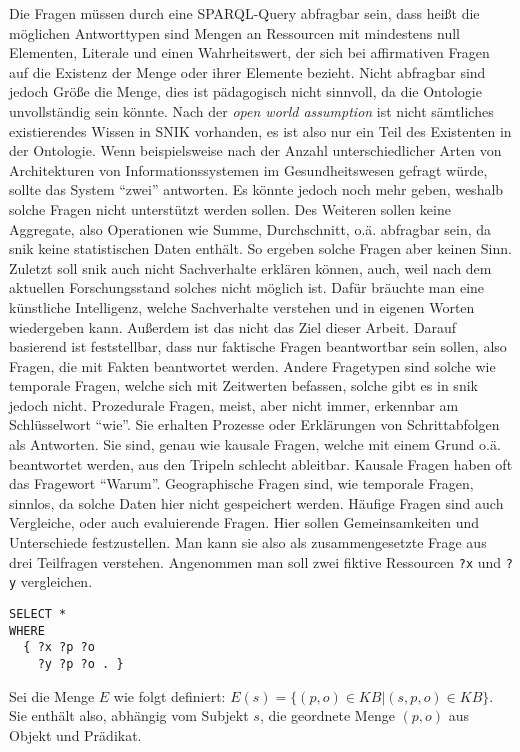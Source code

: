 Die Fragen müssen durch eine SPARQL-Query abfragbar sein, dass heißt die möglichen Antworttypen sind Mengen an Ressourcen mit mindestens null Elementen, Literale und einen Wahrheitswert,
der sich bei affirmativen Fragen auf die Existenz der Menge oder ihrer Elemente bezieht.
Nicht abfragbar sind jedoch Größe die Menge, dies ist pädagogisch nicht sinnvoll, da die Ontologie unvollständig sein könnte.
Nach der \emph{open world assumption} ist nicht sämtliches existierendes Wissen in SNIK vorhanden, es ist also nur ein Teil des Existenten in der Ontologie.
Wenn beispielsweise nach der Anzahl unterschiedlicher Arten von Architekturen von Informationssystemen im Gesundheitswesen gefragt würde, sollte das System \enquote{zwei} antworten.
Es könnte jedoch noch mehr geben, weshalb solche Fragen nicht unterstützt werden sollen.
Des Weiteren sollen keine Aggregate, also Operationen wie Summe, Durchschnitt, o.ä. abfragbar sein, da \ac{snik} keine statistischen Daten enthält.
So ergeben solche Fragen aber keinen Sinn.
Zuletzt soll \ac{snik} auch nicht Sachverhalte erklären können, auch, weil nach dem aktuellen Forschungsstand solches nicht möglich ist.
Dafür bräuchte man eine künstliche Intelligenz, welche Sachverhalte verstehen und in eigenen Worten wiedergeben kann.
Außerdem ist das nicht das Ziel dieser Arbeit.
Darauf basierend ist feststellbar, dass nur faktische Fragen beantwortbar sein sollen, also Fragen, die mit Fakten beantwortet werden.
Andere Fragetypen sind solche wie temporale Fragen, welche sich mit Zeitwerten befassen, solche gibt es in \ac{snik} jedoch nicht.
Prozedurale Fragen, meist, aber nicht immer, erkennbar am Schlüsselwort \enquote{wie}.
Sie erhalten Prozesse oder Erklärungen von Schrittabfolgen als Antworten.
Sie sind, genau wie kausale Fragen, welche mit einem Grund o.ä. beantwortet werden, aus den Tripeln schlecht ableitbar.
Kausale Fragen haben oft das Fragewort \enquote{Warum}.
Geographische Fragen sind, wie temporale Fragen, sinnlos, da solche Daten hier nicht gespeichert werden.
Häufige Fragen sind auch Vergleiche, oder auch evaluierende Fragen.
Hier sollen Gemeinsamkeiten und Unterschiede festzustellen.
Man kann sie also als zusammengesetzte Frage aus drei Teilfragen verstehen.
Angenommen man soll zwei fiktive Ressourcen \texttt{?x} und \texttt{?y} vergleichen.
\begin{lstlisting}[language=SPARQL]
SELECT *
WHERE
  { ?x ?p ?o
    ?y ?p ?o . }
\end{lstlisting}
Sei die Menge $E$ wie folgt definiert:
$E(s) = \{(p,o) \in KB | (s,p,o) \in KB\}$.
Sie enthält also, abhängig vom Subjekt $s$, die geordnete Menge $(p,o)$ aus Objekt und Prädikat.
